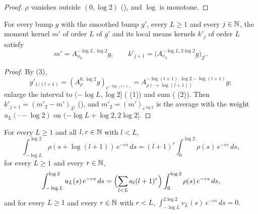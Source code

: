 \begin{proof}
\leanok
$\rho$ vanishes outside $(0, \log 2)$ (), and $\log$ is monotone.
\end{proof}

\begin{theorem}
\label{thm:smoothed-bump-kernels}
\leanok
{}
For every bump $g$ with the smoothed bump $g'$, every $L \geq 1$ and every $j \in \mathbb{N}$, the moment
kernel $m'$ of
order $L$ of $g'$ and its local means kernels $k'_j$ of order $L$ satisfy
\[
  m' = A^{-\log L, \log 2}_{u_L} g , \qquad
  k'_{j+1} = \bigl(A^{-\log L, 2 \log 2}_{v_L} g\bigr)_{2^j} .
\]
\end{theorem}

\begin{proof}
\leanok
By  (3),
\[
  g'_{1/(l+1)} = (A^{0, \log 2}_\rho g)_{e^{-\log(l+1)}}
  = A^{-\log(l+1), \log 2 - \log(l+1)}_{\rho(\cdot + \log(l+1))} g ;
\]
enlarge the interval to $(-\log L, \log 2]$
( (1)) and sum ( (2)).
Then $k'_{j+1} = (m'_2 - m')_{2^j}$ (), and
$m'_2 = (m')_{e^{\log 2}}$ is the average with the
weight $u_L(\cdot - \log 2)$ on $(-\log L + \log 2, 2 \log 2]$.
\end{proof}

\begin{theorem}
\label{thm:kernel-weight-moments}
\leanok
{}
For every $L \geq 1$ and all $l, r \in \mathbb{N}$ with $l < L$,
\[
  \int_{-\log L}^{\log 2} \rho(s + \log(l + 1)) \, e^{-rs} \, ds
    = (l + 1)^r \int_0^{\log 2} \rho(s) \, e^{-rs} \, ds ,
\]
for every $L \geq 1$ and every $r \in \mathbb{N}$,
\[
  \int_{-\log L}^{\log 2} u_L(s) \, e^{-rs} \, ds
    = \Bigl(\sum_{l < L} a_l (l + 1)^r\Bigr) \int_0^{\log 2} \rho(s) \, e^{-rs} \, ds ,
\]
and for every $L \geq 1$ and every $r \in \mathbb{N}$ with $r < L$,
$\int_{-\log L}^{2 \log 2} v_L(s) \, e^{-rs} \, ds = 0$.
\end{theorem}

